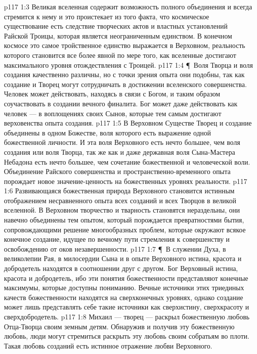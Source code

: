 \vs p117 1:3 Великая вселенная содержит возможность полного объединения и всегда стремится к нему и это проистекает из того факта, что космическое существование есть следствие творческих актов и властных установлений Райской Троицы, которая является неограниченным единством. В конечном космосе это самое тройственное единство выражается в Верховном, реальность которого становится все более явной по мере того, как вселенные достигают максимального уровня отождествления с Троицей.
\vs p117 1:4 \P\ Воля Творца и воля создания качественно различны, но с точки зрения опыта они подобны, так как создание и Творец могут сотрудничать в достижении вселенского совершенства. Человек может действовать, находясь в связи с Богом, и таким образом соучаствовать в создании вечного финалита. Бог может даже действовать как человек --- в воплощениях своих Сынов, которые тем самым достигают верховенства опыта создания.
\vs p117 1:5 В Верховном Существе Творец и создание объединены в одном Божестве, воля которого есть выражение одной божественной личности. И эта воля Верховного есть нечто большее, чем воля создания или воля Творца, так же как и даже державная воля Сына\hyp{}Мастера Небадона есть нечто большее, чем сочетание божественной и человеческой воли. Объединение Райского совершенства и пространственно\hyp{}временного опыта порождает новое значение\hyp{}ценность на божественных уровнях реальности.
\vs p117 1:6 Развивающаяся божественная природа Верховного становится истинным отображением несравненного опыта всех созданий и всех Творцов в великой вселенной. В Верховном творчество и тварность становятся нераздельны, они навечно объединены тем опытом, который порождается превратностями бытия, сопровождающими решение многообразных проблем, которые окружают всякое конечное создание, идущее по вечному пути стремления к совершенству и освобождению от оков незавершенности.
\vs p117 1:7 \P\ В служении Духа, в великолепии Рая, в милосердии Сына и в опыте Верховного истина, красота и добродетель находятся в соотношении друг с другом. Бог Верховный  истина, красота и добродетель, ибо эти понятия божественности представляют конечные максимумы, которые доступны пониманию. Вечные источники этих триединых качеств божественности находятся на сверхконечных уровнях, однако создание может лишь представлять себе такие источники как сверхистину, сверхкрасоту и сверхдобродетель.
\vs p117 1:8 Михаил --- творец --- раскрыл божественную любовь Отца\hyp{}Творца своим земным детям. Обнаружив и получив эту божественную любовь, люди могут стремиться раскрыть эту любовь своим собратьям во плоти. Такая любовь созданий есть истинное отражение любви Верховного.

